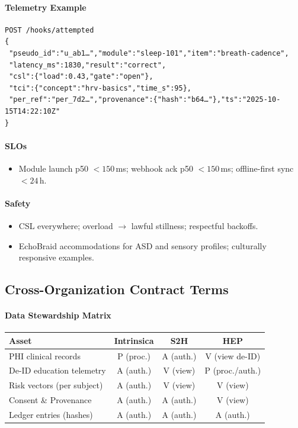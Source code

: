 \documentclass[11pt]{article}
\theoremstyle{plain}
\begin{document}
\paragraph{Telemetry Example}
\begin{verbatim}
POST /hooks/attempted
{
 "pseudo_id":"u_ab1…","module":"sleep-101","item":"breath-cadence",
 "latency_ms":1830,"result":"correct",
 "csl":{"load":0.43,"gate":"open"},
 "tci":{"concept":"hrv-basics","time_s":95},
 "per_ref":"per_7d2…","provenance":{"hash":"b64…"},"ts":"2025-10-15T14:22:10Z"
}
\end{verbatim}

\paragraph{SLOs}
\begin{itemize}
  \item Module launch p50 $<150$\,ms; webhook ack p50 $<150$\,ms; offline-first sync $<24$\,h.
\end{itemize}

\paragraph{Safety}
\begin{itemize}
  \item CSL everywhere; overload $\rightarrow$ lawful stillness; respectful backoffs.
  \item EchoBraid accommodations for ASD and sensory profiles; culturally responsive examples.
\end{itemize}

\bigskip
\subsection{Cross-Organization Contract Terms}

\paragraph{Data Stewardship Matrix}
\begin{center}
\begin{tabular}{l|c|c|c}
\hline
\textbf{Asset} & \textbf{Intrinsica} & \textbf{S2H} & \textbf{HEP} \\
\hline
PHI clinical records & P (proc.) & A (auth.) & V (view de-ID) \\
De-ID education telemetry & A (auth.) & V (view) & P (proc./auth.) \\
Risk vectors (per subject) & A (auth.) & V (view) & V (view) \\
Consent \& Provenance & A (auth.) & A (auth.) & V (view) \\
Ledger entries (hashes) & A (auth.) & A (auth.) & A (auth.) \\
\hline
\end{tabular}
\end{center}
\end{document}
